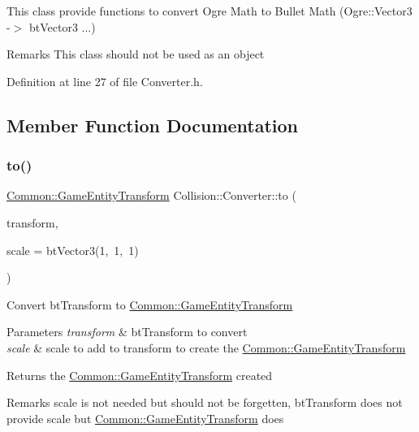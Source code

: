 This class provide functions to convert Ogre Math to Bullet Math (Ogre\+::\+Vector3 -\/$>$ bt\+Vector3 ...) \begin{DoxyRemark}{Remarks}
This class should not be used as an object 
\end{DoxyRemark}


Definition at line 27 of file Converter.\+h.



\subsection{Member Function Documentation}
\mbox{\label{class_collision_1_1_converter_a1b08b8571e6e0973029e6eb492cd7888}} 
\subsubsection{\texorpdfstring{to()}{to()}\hspace{0.1cm}{\footnotesize\ttfamily [1/6]}}
{\footnotesize\ttfamily \hyperlink{struct_common_1_1_game_entity_transform}{Common\+::\+Game\+Entity\+Transform} Collision\+::\+Converter\+::to (\begin{DoxyParamCaption}\item[{const bt\+Transform \&}]{transform,  }\item[{bt\+Vector3}]{scale = {\ttfamily btVector3(1,~1,~1)} }\end{DoxyParamCaption})\hspace{0.3cm}{\ttfamily [static]}}

Convert bt\+Transform to \hyperlink{struct_common_1_1_game_entity_transform}{Common\+::\+Game\+Entity\+Transform} 
\begin{DoxyParams}{Parameters}
{\em transform} & bt\+Transform to convert \\
\hline
{\em scale} & scale to add to transform to create the \hyperlink{struct_common_1_1_game_entity_transform}{Common\+::\+Game\+Entity\+Transform} \\
\hline
\end{DoxyParams}
\begin{DoxyReturn}{Returns}
the \hyperlink{struct_common_1_1_game_entity_transform}{Common\+::\+Game\+Entity\+Transform} created 
\end{DoxyReturn}
\begin{DoxyRemark}{Remarks}
scale is not needed but should not be forgetten, bt\+Transform does not provide scale but \hyperlink{struct_common_1_1_game_entity_transform}{Common\+::\+Game\+Entity\+Transform} does 
\end{DoxyRemark}


